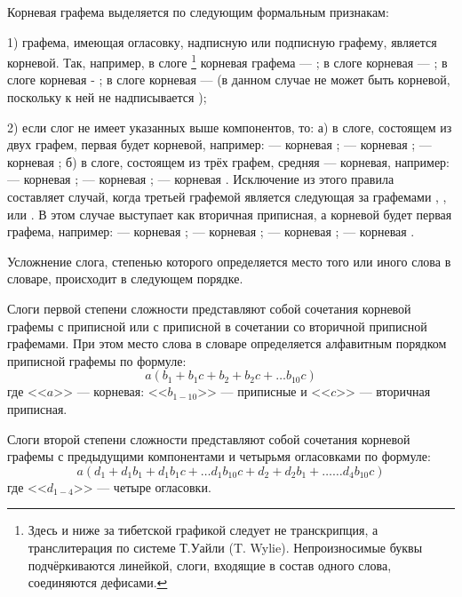Корневая графема выделяется по следующим формальным признакам:

1) графема, имеющая огласовку, надписную или подписную графему, является корневой. Так, например, в слоге \footnote[17]{Здесь и ниже за тибетской графикой следует не транскрипция, а транслитерация по системе Т.Уайли (T. Wylie). Непроизносимые буквы подчёркиваются линейкой, слоги, входящие в состав одного слова, соединяются дефисами.} корневая графема --- ; в слоге  корневая --- ; в слоге	 корневая - ; в слоге  корневая ---  (в данном случае  не может быть корневой, поскольку к ней не надписывается );

2)	если слог не имеет указанных выше компонентов, то: а) в слоге, состоящем из двух графем, первая будет корневой, например:
 --- корневая ;
 --- корневая ;
 ---	корневая ;
б) в слоге, состоящем из трёх графем, средняя --- корневая, например:
 --- корневая ;
 --- корневая ;
 --- корневая .
Исключение из этого правила составляет случай, когда третьей графемой является  следующая за графемами , ,  или . В этом случае  выступает как вторичная приписная, а корневой будет первая графема, например:
 --- корневая ;
 --- корневая ;
 --- корневая ;
 --- корневая .

Усложнение слога, степенью которого определяется место того или иного слова в словаре, происходит в следующем порядке.

Слоги первой степени сложности представляют собой сочетания корневой графемы с приписной или с приписной в сочетании со вторичной приписной графемами. При этом место слова в словаре определяется алфавитным порядком приписной графемы по формуле:
\begin{equation*}
a(b_{1} + b_{1}c + b_{2} + b_{2}c + \dots{}b_{10}c)
\end{equation*}
где <<$a$>> --- корневая: <<$b_{1-10}$>> --- приписные и <<$c$>> — вторичная приписная.

Слоги второй степени сложности представляют собой сочетания корневой графемы с предыдущими компонентами и четырьмя огласовками по формуле:
\begin{equation*}
	a(d_{1} + d_{1}b_{1} + d_{1}b_{1}c + \dots{}d_{1}b_{10}c + d_{2} + d_{2}b_{1} + \dots{}\dots{}d_{4}b_{10}c)
\end{equation*}
где <<$d_{1-4}$>> --- четыре огласовки.


